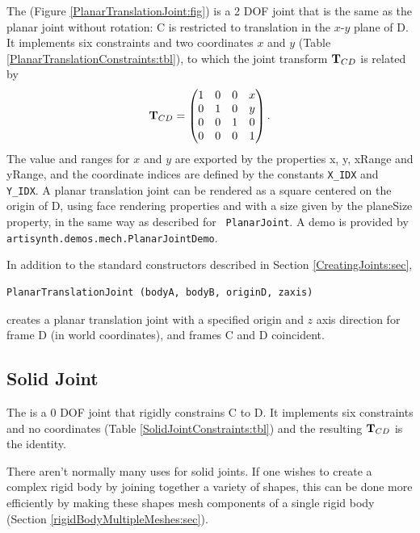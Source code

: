 The  
(Figure \ref{PlanarTranslationJoint:fig}) is a 2 DOF joint
that is the same as the planar joint without rotation:
C is restricted to translation in the $x$-$y$ plane of D.
It implements six
constraints and two coordinates $x$ and $y$
(Table \ref{PlanarTranslationConstraints:tbl}), to which the joint transform
${\bf T}_{CD}$ is related by
%
\begin{equation*}
{\bf T}_{CD} = \left(\begin{matrix}
1 & 0 & 0 & x \\
0 & 1 & 0 & y \\
0 & 0 & 1 & 0 \\
0 & 0 & 0 & 1 
\end{matrix}\right).
\end{equation*}
The value and ranges for $x$ and $y$ are exported by the properties
{\sf x}, {\sf y}, {\sf xRange} and {\sf yRange}, and the coordinate
indices are defined by the constants {\tt X\_IDX} and {\tt Y\_IDX}.  A
planar translation joint can be rendered as a square centered on the
origin of D, using face rendering properties and with a size given by
the {\sf planeSize} property, in the same way as described for {\tt
PlanarJoint}.  A demo is provided by {\tt
artisynth.demos.mech.PlanarJointDemo}.

In addition to the standard constructors described in
Section \ref{CreatingJoints:sec},
%
\begin{lstlisting}[]
  PlanarTranslationJoint (bodyA, bodyB, originD, zaxis)
\end{lstlisting}
%
creates a planar translation joint with a specified origin and $z$
axis direction for frame D (in world coordinates), and frames C and D
coincident.

\subsection{Solid Joint}

The  
is a 0 DOF joint that rigidly constrains C to D.  It
implements six constraints and no coordinates
(Table \ref{SolidJointConstraints:tbl}) and the resulting ${\bf T}_{CD}$ is the
identity.

\begin{sideblock}
There aren't normally many uses for solid joints. If one wishes to
create a complex rigid body by joining together a variety of shapes,
this can be done more efficiently by making these shapes mesh
components of a single rigid body
(Section \ref{rigidBodyMultipleMeshes:sec}).
\end{sideblock}

